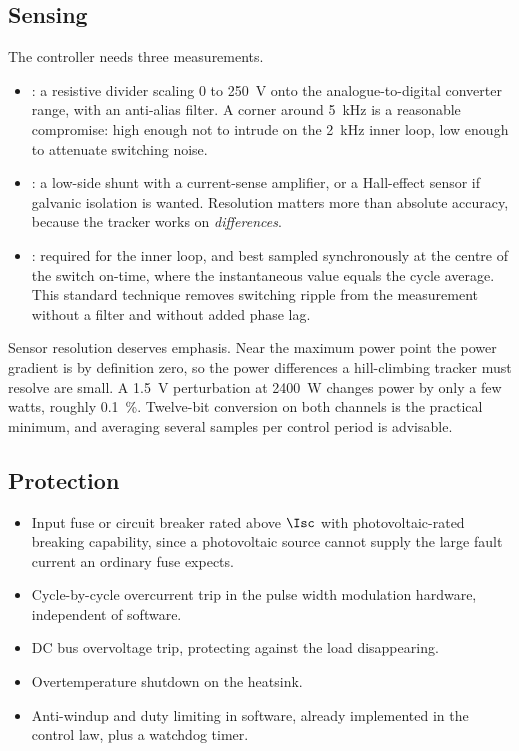 \subsection{Sensing}

The controller needs three measurements.

\begin{itemize}[leftmargin=1.4em]
  \item {}: a resistive divider scaling \SI{0}{} to
        \SI{250}{\volt} onto the analogue-to-digital converter range, with an
        anti-alias filter. A corner around \SI{5}{\kilo\hertz} is a reasonable
        compromise: high enough not to intrude on the \SI{2}{\kilo\hertz} inner
        loop, low enough to attenuate switching noise.
  \item {}: a low-side shunt with a current-sense amplifier, or a
        Hall-effect sensor if galvanic isolation is wanted. Resolution matters
        more than absolute accuracy, because the tracker works on
        \emph{differences}.
  \item {}: required for the inner loop, and best sampled
        synchronously at the centre of the switch on-time, where the
        instantaneous value equals the cycle average. This standard technique
        removes switching ripple from the measurement without a filter and
        without added phase lag.
\end{itemize}

Sensor resolution deserves emphasis. Near the maximum power point the power
gradient is by definition zero, so the power differences a hill-climbing tracker
must resolve are small. A \SI{1.5}{\volt} perturbation at
\SI{2400}{\watt} changes power by only a few watts, roughly
\SI{0.1}{\percent}. Twelve-bit conversion on both channels is the practical
minimum, and averaging several samples per control period is advisable.

\subsection{Protection}

\begin{itemize}[leftmargin=1.4em]
  \item Input fuse or circuit breaker rated above $\Isc$ with photovoltaic-rated
        breaking capability, since a photovoltaic source cannot supply the large
        fault current an ordinary fuse expects.
  \item Cycle-by-cycle overcurrent trip in the pulse width modulation hardware,
        independent of software.
  \item DC bus overvoltage trip, protecting against the load disappearing.
  \item Overtemperature shutdown on the heatsink.
  \item Anti-windup and duty limiting in software, already implemented in the
        control law, plus a watchdog timer.
\end{itemize}

